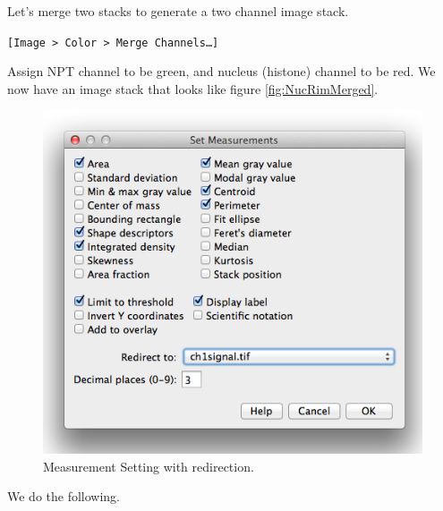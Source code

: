 \documentclass[11pt,a4paper,oneside]{report}
\newcommand{\ilcom}[1]{\texttt{\small#1}}
\begin{document}
Let's merge two stacks to generate a two channel image stack. 

\ilcom{[Image > Color > Merge Channels\ldots]}

Assign NPT channel to be green, and nucleus (histone) channel to be red. We now have an image stack that looks like figure \ref{fig:NucRimMerged}.

\begin{figure}[h!]
\begin{center}
\includegraphics[scale=0.5]{fig/SetMeasurementsRedirect.png}
\caption{Measurement Setting with redirection.}
\label{fig:MeasSettingRedirect}
\end{center}
\end{figure}


We do the following. 
\end{document}
